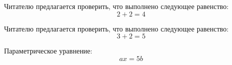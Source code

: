 \documentclass[a4paper, 12pt]{article}
\begin{document}
    Читателю предлагается проверить, что выполнено следующее равенство:
    \[2 + 2 = 4\] %
    
    Читателю предлагается проверить, что выполнено следующее равенство: %
    $$3 + 2 = 5$$ %

    Параметрическое уравнение:
    \[ax = 5b\] %
\end{document}
